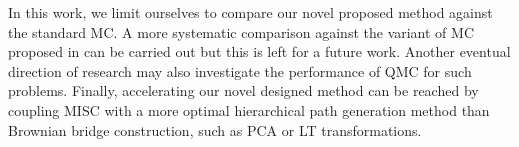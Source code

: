 In this work, we limit ourselves to compare our novel proposed method against the standard MC. A more systematic comparison against the variant of MC proposed in \cite{mccrickerd2017turbocharging}  can be carried out but this is left for a future work. Another  eventual direction of research may also investigate the performance of QMC for such problems. Finally, accelerating  our novel designed method can be reached  by coupling MISC with a more optimal hierarchical path generation method than Brownian bridge construction, such as PCA or LT transformations.